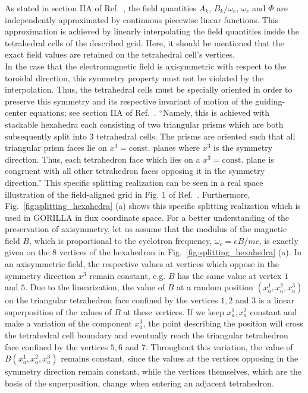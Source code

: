 \documentclass{TheMartianReport}
\begin{document}
As stated in section IIA of Ref.~, the field quantities $A_k$, $B_k/\omega_c$, $\omega_c$ and $\Phi$ are independently approximated by continuous piecewise linear functions. This approximation is achieved by linearly interpolating the field quantities inside the tetrahedral cells of the described grid. Here, it should be mentioned that the exact field values are retained on the tetrahedral cell's vertices. \\
%
In the case that the electromagnetic field is axisymmetric with respect to the toroidal direction, this symmetry property must not be violated by the interpolation. Thus, the tetrahedral cells must be specially oriented in order to preserve this symmetry and its respective invariant of motion of the guiding-center equations; see section IIA of Ref.~.
``Namely, this is achieved with stackable hexahedra each consisting of two triangular prisms which are both subsequently split into
3 tetrahedral cells.  The prisms are oriented such that all triangular prism faces lie on
$x^3= \mathrm{const.}$ planes where $x^3$ is the symmetry direction.
Thus, each tetrahedron face which lies on a $x^3= \mathrm{const.}$ plane is congruent with
all other tetrahedron faces opposing it in the symmetry direction.''\cite{eder_quasi-geometric_2020}
This specific splitting realization can be seen in a real space illustration of the field-aligned grid in Fig. 1 of Ref.~. Furthermore, Fig.~\ref{fig:splitting_hexahedra} (a) shows this specific splitting realization which is used in GORILLA in flux coordinate space. For a better understanding of the preservation of axisymmetry, let us assume that the modulus of the magnetic field $B$, which is proportional to the cyclotron frequency, $\omega_c = e B / m c$, is exactly given on the 8 vertices of the hexahedron in Fig.~\ref{fig:splitting_hexahedra} (a). In an axisymmetric field, the respective values at vertices which oppose in the symmetry direction $x^3$ remain constant, e.g.  $B$ has the same value at vertex $1$ and $5$. Due to the linearization, the value of $B$ at a random position $(x^1_a,x^2_a,x^3_a)$ on the triangular tetrahedron face confined by the vertices $1,2$ and $3$ is a linear superposition of the values of $B$ at these vertices. If we keep $x^1_a,x^2_a$ constant and make a variation of the component $x^3_a$, the point describing the position will cross the tetrahedral cell boundary and eventually reach the triangular tetrahedron face confined by the vertices $5,6$ and $7$. Throughout this variation, the value of $B(x^1_a,x^2_a,x^3_a)$ remains constant, since the values at the vertices opposing in the symmetry direction remain constant, while the vertices themselves, which are the basis of the superposition, change when entering an adjacent tetrahedron.\\
\end{document}
